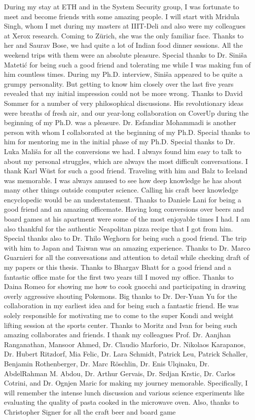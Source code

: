 During my stay at ETH and in the System Security group, I was fortunate to meet and become friends with some amazing people. I will start with Mridula Singh, whom I met during my masters at IIIT-Deli and also were my colleagues at Xerox research. Coming to Z\"urich, she was the only familiar face. Thanks to her and Saurav Bose, we had quite a lot of Indian food dinner sessions. All the weekend trips with them were an absolute pleasure. Special thanks to Dr. Sini\v{s}a Mateti\'c for being such a good friend and tolerating me while I was making fun of him countless times. During my Ph.D. interview, Sini\v{s}a appeared to be quite a grumpy personality. But getting to know him closely over the last five years revealed that my initial impression could not be more wrong. Thanks to David Sommer for a number of very philosophical discussions. His revolutionary ideas were breaths of fresh air, and our year-long collaboration on CoverUp during the beginning of my Ph.D. was a pleasure. Dr. Esfandiar Mohammadi is another person with whom I collaborated at the beginning of my Ph.D. Special thanks to him for mentoring me in the initial phase of my Ph.D. Special thanks to Dr. Luka Mali\v{s}a for all the conversions we had. I always found him easy to talk to about my personal struggles, which are always the most difficult conversations. I thank Karl W\"ust for such a good friend. Traveling with him and Balz to Iceland was memorable. I was always amused to see how deep knowledge he has about many other things outside computer science. Calling his craft beer knowledge encyclopedic would be an understatement. Thanks to Daniele Lani for being a good friend and an amazing officemate. Having long conversions over beers and board games at his apartment were some of the most enjoyable times I had. I am also thankful for the authentic Neapolitan pizza recipe that I got from him. Special thanks also to Dr. Thilo Weghorn for being such a good friend. The trip with him to Japan and Taiwan was an amazing experience. Thanks to Dr. Marco Guarnieri for all the conversations and attention to detail while checking draft of my papers or this thesis. Thanks to Bhargav Bhatt for a good friend and a fantastic office mate for the first two years till I moved my office. Thanks to Daina Romeo for showing me how to cook gnocchi and participating in drawing overly aggressive shouting Pokemons. Big thanks to Dr. Der-Yuan Yu for the collaboration in my earliest idea and for being such a fantastic friend. He was solely responsible for motivating me to come to the super Kondi and weight lifting session at the sports center. Thanks to Moritz and Ivan for being such amazing collaborates and friends. I thank my colleagues  Prof. Dr. Aanjhan Ranganathan, Mansoor Ahmed, Dr. Claudio Marforio, Dr. Nikolaos Karapanos, Dr. Hubert Ritzdorf, Mia Felic, Dr. Lara Schmidt, Patrick Leu, Patrick Schaller, Benjamin Rothenberger, Dr. Marc R\"oschlin, Dr. Enis Ulqinaku, Dr. AbdelRahman M. Abdou, Dr. Arthur Gervais, Dr. Srdjan Krstic, Dr. Carlos Cotrini, and Dr. Ognjen Maric for making my journey memorable. Specifically, I will remember the intense lunch discussion and various science experiments like evaluating the quality of pasta cooked in the microwave oven. Also, thanks to Christopher Signer for all the craft beer and board game 